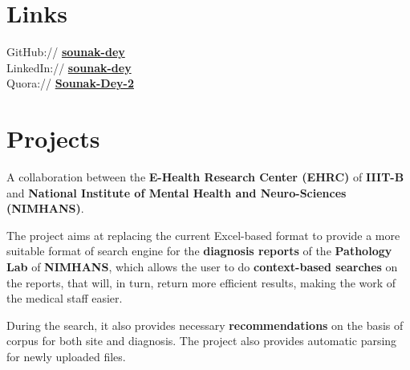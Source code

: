 \documentclass[]{essdee-resume}
\begin{document}
\begin{minipage}[t]{0.33\textwidth}
\section{Links} 
GitHub:// \href{https://github.com/Sounak-Dey}{\bf sounak-dey} \\
LinkedIn://  \href{https://www.linkedin.com/in/sounak-dey}{\bf sounak-dey} \\
Quora://  \href{https://www.quora.com/profile/Sounak-Dey-2}{\bf Sounak-Dey-2}


%
%

\end{minipage} 
\hfill
\begin{minipage}[t]{0.66\textwidth} 


\section{Projects}

\vspace{\topsep} %
\begin{tightemize}
\item A collaboration between the \textbf{E-Health Research Center (EHRC)} of \textbf{IIIT-B} and  \textbf{National Institute of Mental Health and Neuro-Sciences (NIMHANS)}. 
\item The project aims at replacing the current Excel-based format to provide a more suitable format of search engine for the \textbf{diagnosis reports} of the \textbf{Pathology Lab} of \textbf{NIMHANS}, which allows the user to do \textbf{context-based searches} on the reports, that will, in turn, return more efficient results, making the work of the medical staff easier.
\item During the search, it also provides necessary \textbf{recommendations} on the basis of corpus for both site and diagnosis. The project also provides automatic parsing for newly uploaded files. 
\end{tightemize}
\sectionsep


\end{minipage}
\end{document}
